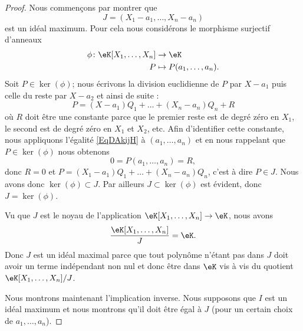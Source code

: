 \begin{proof}
    Nous commençons par montrer que
    \begin{equation}
        J=(X_1-a_1,\ldots, X_n-a_n)
    \end{equation}
    est un idéal maximum. Pour cela nous considérons le morphisme surjectif d'anneaux
    \begin{equation}
        \begin{aligned}
            \phi\colon \eK[X_1,\ldots, X_n]&\to \eK \\
            P&\mapsto P(a_1,\ldots, a_n). 
        \end{aligned}
    \end{equation}
    Soit \( P\in\ker(\phi)\); nous écrivons la division euclidienne de \( P\) par \( X-a_1\) puis celle du reste par \( X-a_2\) et ainsi de suite :
    \begin{equation}    \label{EqDAkijH}
        P=(X-a_1)Q_1+\ldots +(X_n-a_n)Q_n+R
    \end{equation}
    où \( R\) doit être une constante parce que le premier reste est de degré zéro en \( X_1\), le second est de degré zéro en \( X_1\) et \( X_2\), etc. Afin d'identifier cette constante, nous appliquons l'égalité \eqref{EqDAkijH} à \( (a_1,\ldots, a_n)\) et en nous rappelant que \( P\in \ker(\phi)\) nous obtenons
    \begin{equation}
        0=P(a_1,\ldots, a_n)=R,
    \end{equation}
    donc \( R=0\) et \( P=(X_1-a_1)Q_1+\ldots +(X_n-a_n)Q_n\), c'est à dire \( P\in J\). Nous avons donc \( \ker(\phi)\subset J\). Par ailleurs \( J\subset \ker(\phi)\) est évident, donc \( J=\ker(\phi)\).

    Vu que \( J\) est le noyau de l'application \( \eK[X_1,\ldots, X_n]\to \eK\), nous avons 
    \begin{equation}
        \frac{ \eK[X_1,\ldots, X_n] }{ J }=\eK.
    \end{equation}
    Donc \( J\) est un idéal maximal parce que tout polynôme n'étant pas dans \( J\) doit avoir un terme indépendant non nul et donc être dans \( \eK\) vis à vis du quotient \( \eK[X_1,\ldots, X_n]/J\).

    Nous montrons maintenant l'implication inverse. Nous supposons que \( I\) est un idéal maximum et nous montrons qu'il doit être égal à \( J\) (pour un certain choix de \( a_1,\ldots, a_n\)).


\end{proof}

